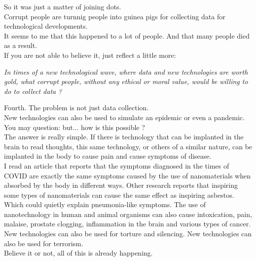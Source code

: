\documentclass[11pt]{book}
\begin{document}
\noindent So it was just a matter of joining dots. \\

\noindent Corrupt people are turnnig people into guinea pigs for collecting data for technological developments. \\

\noindent It seems to me that this happened to a lot of people. And that many people died as a result. \\

\noindent If you are not able to believe it, just reflect a little more:

\noindent \begin{center} \emph{In times of a new technological wave, where data and new technologies are worth gold, what corrupt people, without any ethical or moral value, would be willing to do to collect data ?} \end{center}

\noindent Fourth. The problem is not just data collection. \\

\noindent New technologies can also be used to simulate an epidemic or even a pandemic. \\

\noindent You may question: but... how is this possible ? \\

\noindent The answer is really simple. If there is technology that can be implanted in the brain to read thoughts, this same technology, or others of a similar nature, can be implanted in the body to cause pain and cause symptoms of disease. \\

\noindent I read an article that reports that the symptoms diagnosed in the times of COVID are exactly the same symptoms caused by the use of nanomaterials when absorbed by the body in different ways. Other research reports that inspiring some types of nanomaterials can cause the same effect as inspiring asbestos. Which could quietly explain pneumonia-like symptoms. The use of nanotechnology in human and animal organisms can also cause intoxication, pain, malaise, prostate clogging, inflammation in the brain and various types of cancer. \\

\noindent New technologies can also be used for torture and silencing. New technologies can also be used for terrorism. \\

\noindent Believe it or not, all of this is already happening. \\
\end{document}
